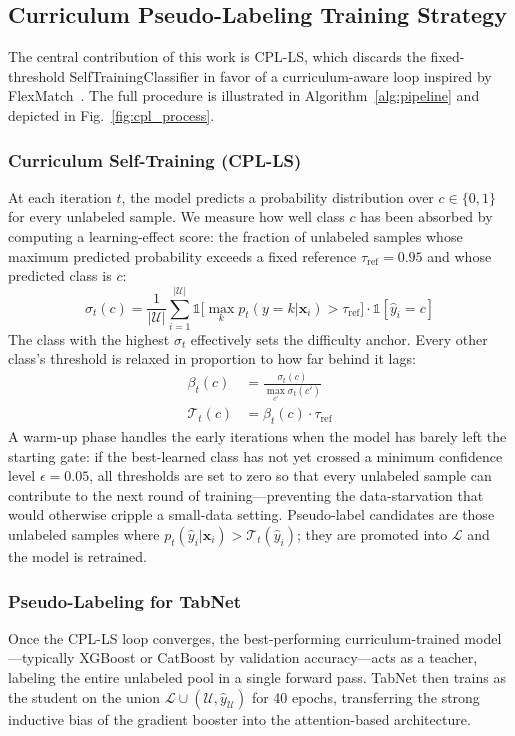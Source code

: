 \documentclass[journal, onecolumn]{IEEEtran}
\begin{document}
\subsection{Curriculum Pseudo-Labeling Training Strategy}

The central contribution of this work is CPL-LS, which discards the fixed-threshold SelfTrainingClassifier in favor of a curriculum-aware loop inspired by FlexMatch~\cite{zhang2021flexmatch}. The full procedure is illustrated in Algorithm~\ref{alg:pipeline} and depicted in Fig.~\ref{fig:cpl_process}.

\subsubsection{Curriculum Self-Training (CPL-LS)}
At each iteration $t$, the model predicts a probability distribution over $c \in \{0, 1\}$ for every unlabeled sample. We measure how well class $c$ has been absorbed by computing a learning-effect score: the fraction of unlabeled samples whose maximum predicted probability exceeds a fixed reference $\tau_{\text{ref}}=0.95$ and whose predicted class is $c$:
\begin{equation}
    \sigma_t(c) = \frac{1}{|\mathcal{U}|}\sum_{i=1}^{|\mathcal{U}|} \mathbb{1}\!\bigl[\max_k p_t(y{=}k|\mathbf{x}_i)>\tau_{\text{ref}}\bigr]\cdot\mathbb{1}[\hat{y}_i=c]
\end{equation}
The class with the highest $\sigma_t$ effectively sets the difficulty anchor. Every other class's threshold is relaxed in proportion to how far behind it lags:
\begin{align}
    \beta_t(c) &= \frac{\sigma_t(c)}{\max_{c'} \sigma_t(c')} \\
    \mathcal{T}_t(c) &= \beta_t(c) \cdot \tau_{\text{ref}}
\end{align}
A warm-up phase handles the early iterations when the model has barely left the starting gate: if the best-learned class has not yet crossed a minimum confidence level $\epsilon = 0.05$, all thresholds are set to zero so that every unlabeled sample can contribute to the next round of training---preventing the data-starvation that would otherwise cripple a small-data setting. Pseudo-label candidates are those unlabeled samples where $p_t(\hat{y}_i|\mathbf{x}_i) > \mathcal{T}_t(\hat{y}_i)$; they are promoted into $\mathcal{L}$ and the model is retrained.

\subsubsection{Pseudo-Labeling for TabNet}
Once the CPL-LS loop converges, the best-performing curriculum-trained model---typically XGBoost or CatBoost by validation accuracy---acts as a teacher, labeling the entire unlabeled pool in a single forward pass. TabNet then trains as the student on the union $\mathcal{L} \cup (\mathcal{U}, \hat{y}_{\mathcal{U}})$ for 40 epochs, transferring the strong inductive bias of the gradient booster into the attention-based architecture.
\end{document}
